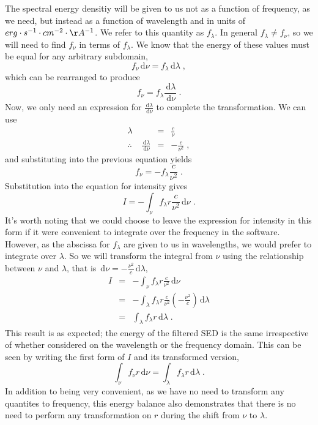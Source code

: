 \documentclass[12pt]{scrartcl}
\newcommand{\dx}[1]{\ensuremath{\,\mathrm{d}#1}}
\begin{document}
The spectral energy densitiy will be given
to us not as a function of frequency, as we need, but instead as
a function of wavelength and in units of
$erg\cdot s^{-1}\cdot cm^{-2}\cdot \AA^{-1}$. We refer to this quantity as
$f_\lambda$. In general $f_\lambda \ne f_\nu$, so we
will need to find $f_\nu$ in terms of $f_\lambda$.
We know that the energy of these values
must be equal for any arbitrary subdomain,
\[ f_\nu \dx{\nu} = f_\lambda \dx{\lambda} \; , \]
which can be rearranged to produce
\[ f_\nu = f_\lambda \frac{\dx{\lambda}}{\dx{\nu}} \; . \]
Now, we only need an expression for $\frac{\dx{\lambda}}{\dx{\nu}}$
to complete the transformation. We can use
\begin{eqnarray*}
\lambda & = & \frac{c}{\nu} \\
\therefore \;\;\;\; \frac{\dx{\lambda}}{\dx{\nu}} & = & -\frac{c}{\nu^2} \; ,
\end{eqnarray*}
and substituting into the previous equation yields
\[ f_\nu = -f_\lambda \frac{c}{\nu^2} \; . \]
Substitution into the equation for intensity gives
\[ I = -\int_\nu f_\lambda r \frac{c}{\nu^2} \dx{\nu} \; . \]
It's worth noting that we could choose to leave the expression
for intensity in this form if it were convenient to integrate
over the frequency in the software. However, as the abscissa for
$f_\lambda$ are given to us in wavelengths, we would prefer to
integrate over $\lambda$. So
we will transform the integral from $\nu$ using the relationship
between $\nu$ and $\lambda$, that is $\dx{\nu} = -\frac{\nu^2}{c}\dx{\lambda}$,
\begin{eqnarray*}
I & = & -\int_\nu f_\lambda r \frac{c}{\nu^2} \dx{\nu} \\
& = & -\int_\lambda f_\lambda r \frac{c}{\nu^2} \left(-\frac{\nu^2}{c}\right) \dx{\lambda} \\
& = & \int_\lambda f_\lambda r \dx{\lambda} \; .
\end{eqnarray*}
This result is as expected; the energy of the filtered SED is the same
irrespective of whether considered on the wavelength or the
frequency domain. This can be seen by writing the first form of
$I$ and its transformed version,
\[ \int_\nu f_\nu r \dx{\nu} = \int_\lambda f_\lambda r \dx{\lambda} \; . \]
In addition to being very convenient, as we have no need
to transform any quantites to frequency, this energy balance also
demonstrates that there is no need to perform any transformation on
$r$ during the shift from $\nu$ to $\lambda$.
\end{document}
